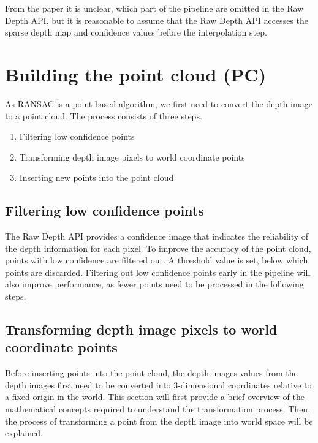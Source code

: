 From the paper it is unclear, which part of the pipeline are omitted in the Raw Depth API,
but it is reasonable to assume that the Raw Depth API accesses the sparse depth map and confidence values before the interpolation step.

\cite{valentin_depth_2018}


\section{Building the point cloud (PC)}
As RANSAC is a point-based algorithm, we first need to convert the depth image to a point cloud.
The process consists of three steps.
\begin{enumerate}
    \item Filtering low confidence points
    \item Transforming depth image pixels to world coordinate points
    \item Inserting new points into the point cloud
\end{enumerate}

\subsection{Filtering low confidence points}
The Raw Depth API provides a confidence image that indicates the reliability of the depth information for each pixel.
To improve the accuracy of the point cloud, points with low confidence are filtered out.
A threshold value is set, below which points are discarded.
Filtering out low confidence points early in the pipeline will also improve performance,
as fewer points need to be processed in the following steps.

\subsection{Transforming depth image pixels to world coordinate points}
Before inserting points into the point cloud, the depth images values from the depth images
first need to be converted into 3-dimensional coordinates relative to a fixed origin in the world.
This section will first provide a brief overview of the mathematical concepts required to understand the transformation process.
Then, the process of transforming a point from the depth image into world space will be explained.


